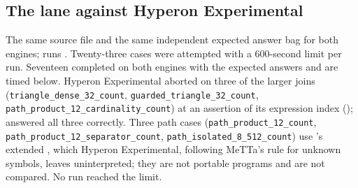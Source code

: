 \subsection{The \HE{} lane against Hyperon Experimental}
\label{app:runtimes-he}

The same source file and the same independent expected answer bag for both
engines; \CeTTa{} runs .  Twenty-three cases were attempted
with a 600-second limit per run.  Seventeen completed on both engines with the expected answers and are
timed below.  Hyperon Experimental aborted on three of the larger joins
(\nolinkurl{triangle_dense_32_count}, \nolinkurl{guarded_triangle_32_count},
\nolinkurl{path_product_12_cardinality_count}) at an assertion of its
expression index (); \CeTTa{}
answered all three correctly.  Three path cases
(\nolinkurl{path_product_12_count}, \nolinkurl{path_product_12_separator_count},
\nolinkurl{path_isolated_8_512_count}) use \CeTTa{}'s extended ,
which Hyperon Experimental, following MeTTa's rule for unknown symbols, leaves
uninterpreted; they are not portable programs and are not compared.  No run
reached the limit.


